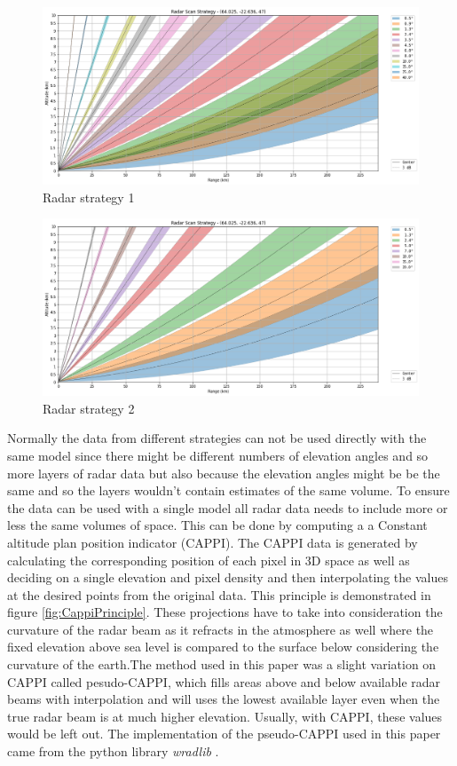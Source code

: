 \begin{figure}[H]
\centering\includegraphics[width=\textwidth]{Pictures/Diagrams/Radar strategies/Strategy 1.png}
\caption{Radar strategy 1}
\label{fig:radarstrat1}
\end{figure}

\begin{figure}[H]
\centering\includegraphics[width=\textwidth]{Pictures/Diagrams/Radar strategies/Strategy 3.png}
\caption{Radar strategy 2}
\label{fig:radarstrat3}
\end{figure}
Normally the data from different strategies can not be used directly with the same model since there might be different numbers of elevation angles and so more layers of radar data but also because the elevation angles might be be the same and so the layers wouldn't contain estimates of the same volume. To ensure the data can be used with a single model all radar data needs to include more or less the same volumes of space. This can be done by computing a  a Constant altitude plan position indicator (CAPPI). The CAPPI data is generated by calculating the corresponding position of each pixel in 3D space as well as deciding on a single elevation and pixel density and then interpolating the values at the desired points from the original data. This principle is demonstrated in figure \ref{fig:CappiPrinciple}. These projections have to take into consideration the curvature of the radar beam as it refracts in the atmosphere as well where the fixed elevation above sea level is compared to the surface below considering the curvature of the earth.The method used in this paper was a slight variation on CAPPI called pesudo-CAPPI, which fills areas above and below available radar beams with interpolation and will uses the lowest available layer even when the true radar beam is at much higher elevation. Usually, with CAPPI, these values would be left out. The implementation of the pseudo-CAPPI used in this paper came from the python library \textit{wradlib} \cite{hess-17-863-2013}.

